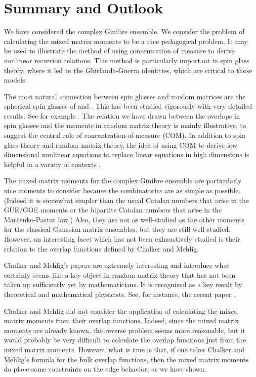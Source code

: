 \documentclass[12pt]{report}
\theoremstyle{definition}
\begin{document}
\section{Summary and Outlook}

We have considered the complex Ginibre ensemble.
We consider the problem of calculating the mixed matrix moments to be a nice pedagogical problem.
It may be used to illustrate the method of using concentration of measure to derive nonlinear recursion relations.
This method is particularly important in spin glass theory, where it led to the Ghirlanda-Guerra identities, which are critical
to those models.


The most natural connection between spin glasses and random matrices are the spherical spin glasses
of \cite{KTJ} and \cite{CS}.
This has been studied vigorously with very detailed results.
See for example \cite{ABAC}.
The relation we have drawn between the overlaps in spin glasses and the moments in random
matrix theory is mainly illustrative, to suggest the central role of concentration-of-measure (COM).
In addition to spin glass theory and random matrix theory, the idea of using COM to derive low-dimensional nonlinear equations
to replace linear equations in high dimensions is helpful in a variety of contexts \cite{CK}.

The mixed matrix moments for the complex Ginibre ensemble are particularly nice moments to consider because the combinatorics
are as simple as possible. (Indeed it is somewhat simpler than the usual Catalan numbers that arise in the GUE/GOE moments
or the bipartite Catalan numbers that arise in the Mar\v{c}enko-Pastur law.)
Also, they are not as well-studied as the other moments for the classical Gaussian matrix ensembles,
but they are still well-studied.
However, an interesting facet which has not been exhaustively studied is their relation to the overlap functions defined by Chalker and Mehlig.

Chalker and Mehlig's papers are extremely interesting and introduce what certainly seems like a key 
object in random matrix theory that has not been taken up sufficiently yet by mathematicians.
It is recognized as a key result by theoretical and mathematical physicists.
See, for instance, the recent paper \cite{Burda}.

Chalker and Mehlig did not consider the application of calculating the mixed matrix moments from their overlap functions.
Indeed, since the mixed matrix moments are already known, the reverse problem seems more reasonable, but it would probably be very difficult to calculate the overlap functions just from the mixed matrix moments.
However, what is true is that, if one takes Chalker and Mehlig's formula for the bulk overlap functions,
then the mixed matrix moments do place some constraints on the edge behavior,
as we have shown. 
\end{document}
